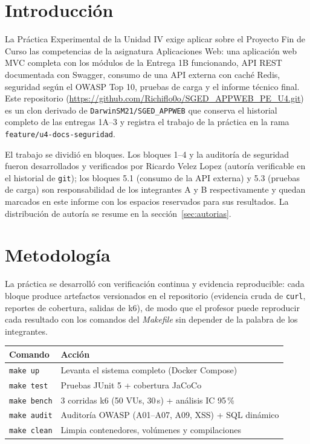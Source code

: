 \documentclass[11pt,a4paper]{article}
\begin{document}
\newpage

\section{Introducción}

La Práctica Experimental de la Unidad IV exige aplicar sobre el Proyecto Fin
de Curso las competencias de la asignatura Aplicaciones Web: una aplicación
web MVC completa con los módulos de la Entrega 1B funcionando, API REST
documentada con Swagger, consumo de una API externa con caché Redis,
seguridad según el OWASP Top 10, pruebas de carga y el informe técnico final.
Este repositorio (\url{https://github.com/Richiflo0o/SGED_APPWEB_PE_U4.git})
es un clon derivado de \texttt{DarwinSM21/SGED\_APPWEB} que conserva el
historial completo de las entregas 1A--3 y registra el trabajo de la práctica
en la rama \texttt{feature/u4-docs-seguridad}.

El trabajo se dividió en bloques. Los bloques 1--4 y la auditoría de
seguridad fueron desarrollados y verificados por Ricardo Velez Lopez
(autoría verificable en el historial de \texttt{git}); los bloques 5.1
(consumo de la API externa) y 5.3 (pruebas de carga) son responsabilidad de
los integrantes A y B respectivamente y quedan marcados en este informe con
los espacios reservados para sus resultados. La distribución de autoría se
resume en la sección~\ref{sec:autorias}.

\section{Metodología}

La práctica se desarrolló con verificación continua y evidencia
reproducible: cada bloque produce artefactos versionados en el repositorio
(evidencia cruda de \texttt{curl}, reportes de cobertura, salidas de k6), de
modo que el profesor puede reproducir cada resultado con los comandos del
\emph{Makefile} sin depender de la palabra de los integrantes.

\begin{center}
\begin{tabular}{@{}ll@{}}
\toprule
\textbf{Comando} & \textbf{Acción} \\
\midrule
\texttt{make up} & Levanta el sistema completo (Docker Compose) \\
\texttt{make test} & Pruebas JUnit 5 + cobertura JaCoCo \\
\texttt{make bench} & 3 corridas k6 (50 VUs, 30\,s) + análisis IC 95\,\% \\
\texttt{make audit} & Auditoría OWASP (A01--A07, A09, XSS) + SQL dinámico \\
\texttt{make clean} & Limpia contenedores, volúmenes y compilaciones \\
\bottomrule
\end{tabular}
\end{center}
\end{document}
